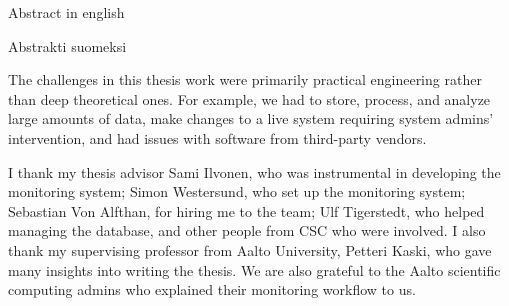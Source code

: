 \makecoverpage
\makecopyrightpage

\begin{abstractpage}[english]
Abstract in english
\end{abstractpage}

\begin{abstractpage}[finnish]
Abstrakti suomeksi
\end{abstractpage}

The challenges in this thesis work were primarily practical engineering rather than deep theoretical ones.
For example, we had to store, process, and analyze large amounts of data, make changes to a live system requiring system admins' intervention, and had issues with software from third-party vendors.

I thank my thesis advisor Sami Ilvonen, who was instrumental in developing the monitoring system; Simon Westersund, who set up the monitoring system; Sebastian Von Alfthan, for hiring me to the team; Ulf Tigerstedt, who helped managing the database, and other people from CSC who were involved.
I also thank my supervising professor from Aalto University, Petteri Kaski, who gave many insights into writing the thesis.
We are also grateful to the Aalto scientific computing admins who explained their monitoring workflow to us.

\newpage

\setcounter{tocdepth}{2}
\thesistableofcontents
